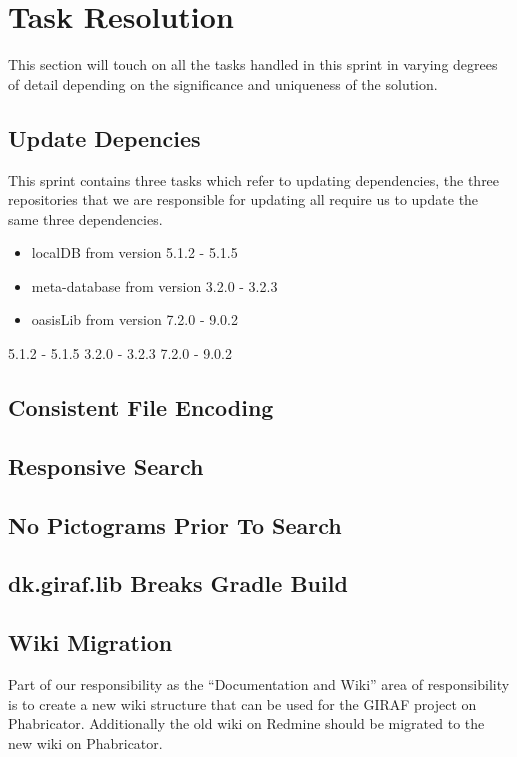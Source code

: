 \section{Task Resolution}
This section will touch on all the tasks handled in this sprint in varying degrees of detail depending on the significance and uniqueness of the solution.

\subsection{Update Depencies}
This sprint contains three tasks which refer to updating dependencies, the three repositories that we are responsible for updating all require us to update the same three dependencies.
\begin{itemize}
    \item localDB from version 5.1.2 - 5.1.5
    \item meta-database from version 3.2.0 - 3.2.3
    \item oasisLib from version 7.2.0 - 9.0.2
\end{itemize}


5.1.2 - 5.1.5
3.2.0 - 3.2.3
7.2.0 - 9.0.2
\subsection{Consistent File Encoding}
\subsection{Responsive Search}
\subsection{No Pictograms Prior To Search}
\subsection{dk.giraf.lib Breaks Gradle Build}
\subsection{Wiki Migration}
Part of our responsibility as the ``Documentation and Wiki'' area of responsibility is to create a new wiki structure that can be used for the GIRAF project on Phabricator.
Additionally the old wiki on Redmine should be migrated to the new wiki on Phabricator. 
